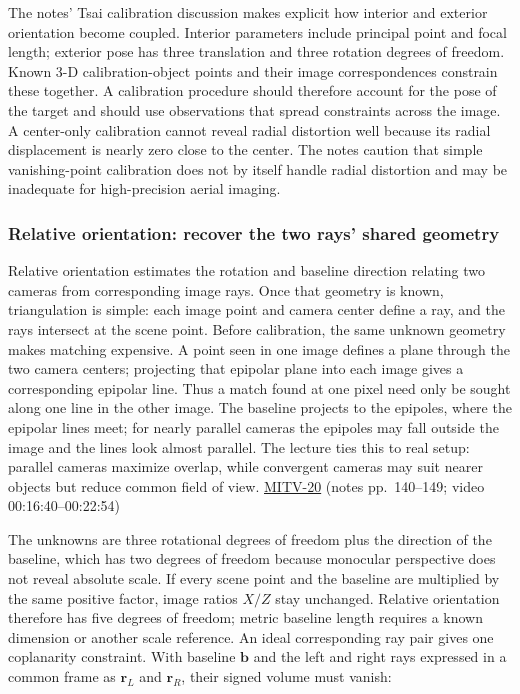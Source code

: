 The notes' Tsai calibration discussion makes explicit how interior and exterior orientation become coupled. Interior parameters include principal point and focal length; exterior pose has three translation and three rotation degrees of freedom. Known 3-D calibration-object points and their image correspondences constrain these together. A calibration procedure should therefore account for the pose of the target and should use observations that spread constraints across the image. A center-only calibration cannot reveal radial distortion well because its radial displacement is nearly zero close to the center. The notes caution that simple vanishing-point calibration does not by itself handle radial distortion and may be inadequate for high-precision aerial imaging.

\subsubsection{Relative orientation: recover the two rays' shared geometry}\label{relative-orientation-recover-the-two-rays-shared-geometry}

Relative orientation estimates the rotation and baseline direction relating two cameras from corresponding image rays. Once that geometry is known, triangulation is simple: each image point and camera center define a ray, and the rays intersect at the scene point. Before calibration, the same unknown geometry makes matching expensive. A point seen in one image defines a plane through the two camera centers; projecting that epipolar plane into each image gives a corresponding epipolar line. Thus a match found at one pixel need only be sought along one line in the other image. The baseline projects to the epipoles, where the epipolar lines meet; for nearly parallel cameras the epipoles may fall outside the image and the lines look almost parallel. The lecture ties this to real setup: parallel cameras maximize overlap, while convergent cameras may suit nearer objects but reduce common field of view. \hyperref[04-visual-computing-ii-ch036]{MITV-20} (notes pp.~140--149; video 00:16:40--00:22:54)

The unknowns are three rotational degrees of freedom plus the direction of the baseline, which has two degrees of freedom because monocular perspective does not reveal absolute scale. If every scene point and the baseline are multiplied by the same positive factor, image ratios \(X/Z\) stay unchanged. Relative orientation therefore has five degrees of freedom; metric baseline length requires a known dimension or another scale reference. An ideal corresponding ray pair gives one coplanarity constraint. With baseline \(\mathbf{b}\) and the left and right rays expressed in a common frame as \(\mathbf{r}_L\) and \(\mathbf{r}_R\), their signed volume must vanish:

